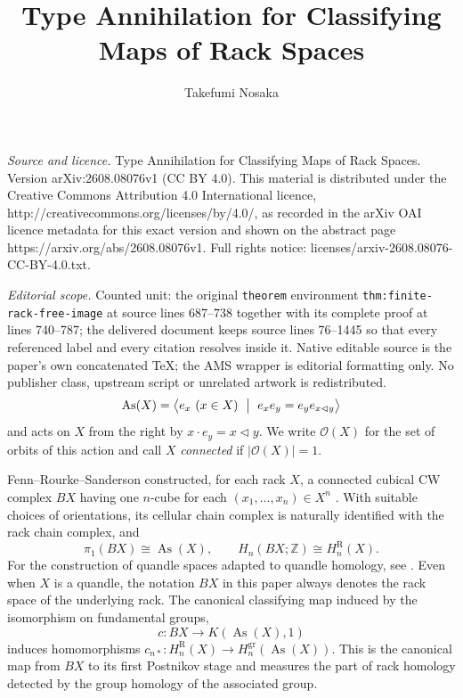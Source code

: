 \documentclass[10pt,a4paper]{amsart}
\DeclareMathOperator{\As}{As}
\newcommand{\ZZ}{\mathbb Z}
\newcommand{\OO}{\mathcal O}
\newcommand{\gr}{\mathrm{gr}}
\newcommand{\R}{\mathrm R}
\begin{document}
\title[Type Annihilation for Classifying Maps of Rack Spaces]{Type Annihilation for Classifying Maps of Rack Spaces}
\author{Takefumi Nosaka}
\date{}
\maketitle
\noindent\emph{Source and licence.} Type Annihilation for Classifying Maps of Rack Spaces. Version arXiv:2608.08076v1 (CC BY 4.0). This material is distributed under the Creative Commons Attribution 4.0 International licence, http://creativecommons.org/licenses/by/4.0/, as recorded in the arXiv OAI licence metadata for this exact version and shown on the abstract page https://arxiv.org/abs/2608.08076v1. Full rights notice: licenses/arxiv-2608.08076-CC-BY-4.0.txt.\par\smallskip
\noindent\textit{Editorial scope.} Counted unit: the original \texttt{theorem} environment \texttt{thm:finite-rack-free-image} at source lines 687--738 together with its complete proof at lines 740--787; the delivered document keeps source lines 76--1445 so that every referenced label and every citation resolves inside it. Native editable source is the paper's own concatenated TeX; the AMS wrapper is editorial formatting only. No publisher class, upstream script or unrelated artwork is redistributed.
\begin{equation}
 \As(X)=\bigl\langle e_x\ (x\in X)\ \bigm|\
 e_xe_y=e_y e_{x\lhd y}\bigr\rangle
 \label{eq:associated-group-intro}
\end{equation}
and acts on $X$ from the right by $x\cdot e_y=x\lhd y$. We write $\OO(X)$ for the set of orbits of this action and call $X$ \emph{connected} if $|\OO(X)|=1$.

Fenn--Rourke--Sanderson constructed, for each rack $X$, a connected cubical CW complex $BX$ having one $n$-cube for each $(x_1,\ldots,x_n)\in X^n$ \cite{FRSTrunks,FRS}. With suitable choices of orientations, its cellular chain complex is naturally identified with the rack chain complex, and
\[
        \pi_1(BX)\cong\As(X),
        \qquad
        H_n(BX;\ZZ)\cong H_n^\R(X).
\]
For the construction of quandle spaces adapted to quandle homology, see \cite{NosakaQuandleSpace,NosakaHomotopical}. Even when $X$ is a quandle, the notation $BX$ in this paper always denotes the rack space of the underlying rack. The canonical classifying map induced by the isomorphism on fundamental groups,
\begin{equation}
        c\colon BX\longrightarrow K(\As(X),1)
        \label{eq:classifying-map-intro}
\end{equation}
induces homomorphisms $c_{n*}\colon H_n^\R(X)\to H_n^{\gr}(\As(X))$. This is the canonical map from $BX$ to its first Postnikov stage and measures the part of rack homology detected by the group homology of the associated group.
\end{document}
